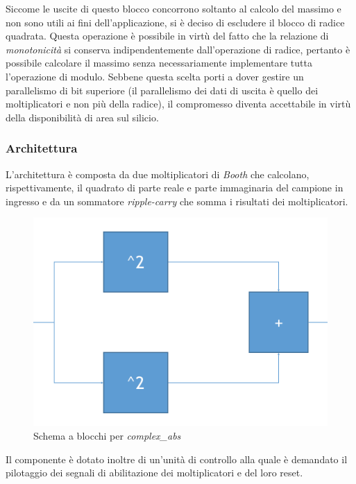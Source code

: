 \documentclass[12pt,a4paper,twoside,openany]{book}
\begin{document}
Siccome le uscite di questo blocco concorrono soltanto al calcolo del massimo e non sono utili ai fini dell'applicazione, si è deciso di escludere il blocco di radice quadrata. Questa operazione è possibile in virtù del fatto che la relazione di \textit{monotonicità} si conserva indipendentemente dall'operazione di radice, pertanto è possibile calcolare il massimo senza necessariamente implementare tutta l'operazione di modulo. Sebbene questa scelta porti a dover gestire un parallelismo di bit superiore (il parallelismo dei dati di uscita è quello dei moltiplicatori e non più della radice), il compromesso diventa accettabile in virtù della disponibilità di area sul silicio.
\subsubsection{Architettura}
L'architettura è composta da due moltiplicatori di \textit{Booth} che calcolano, rispettivamente, il quadrato di parte reale e parte immaginaria del campione in ingresso e da un sommatore \textit{ripple-carry} che somma i risultati dei moltiplicatori.

\begin{figure}[hb]
\begin{center}
\includegraphics[scale=0.5, keepaspectratio]{immagini/complexabs_schemablocchi}
\caption{Schema a blocchi per \textit{complex\_abs}}
\label{complexabs_schemablocchi}
\end{center}
\end{figure}

Il componente è dotato inoltre di un'unità di controllo alla quale è demandato il pilotaggio dei segnali di abilitazione dei moltiplicatori e del loro reset. 
\end{document}
